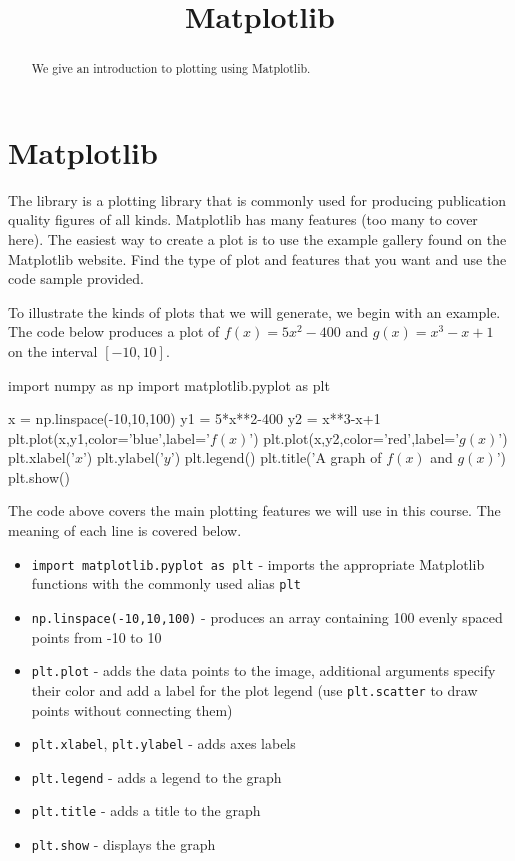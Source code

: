 \documentclass{ximera}
\title{Matplotlib}
\begin{document}
  
\begin{abstract}  
We give an introduction to plotting using Matplotlib.
\end{abstract}  
\maketitle

\section{Matplotlib}

The  library is a plotting library that is commonly used for producing publication quality figures of all kinds. Matplotlib has many features (too many to cover here). The easiest way to create a plot is to use the example gallery found on the Matplotlib website. Find the type of plot and features that you want and use the code sample provided.

To illustrate the kinds of plots that we will generate, we begin with an example. The code below produces a plot of $f(x)=5x^2-400$ and $g(x)=x^3-x+1$ on the interval $[-10,10]$. 

\begin{sageCell}
import numpy as np
import matplotlib.pyplot as plt

x = np.linspace(-10,10,100)
y1 = 5*x**2-400
y2 = x**3-x+1
plt.plot(x,y1,color='blue',label='$f(x)$')
plt.plot(x,y2,color='red',label='$g(x)$')
plt.xlabel('$x$')
plt.ylabel('$y$')
plt.legend()
plt.title('A graph of $f(x)$ and $g(x)$')
plt.show()
\end{sageCell}

The code above covers the main plotting features we will use in this course. The meaning of each line is covered below.

\begin{itemize}
	\item \verb|import matplotlib.pyplot as plt| - imports the appropriate Matplotlib functions with the commonly used alias \verb|plt|
	\item \verb|np.linspace(-10,10,100)| - produces an array containing 100 evenly spaced points from -10 to 10
	\item \verb|plt.plot| - adds the data points to the image, additional arguments specify their color and add a label for the plot legend (use \verb|plt.scatter| to draw points without connecting them)
	\item \verb|plt.xlabel|, \verb|plt.ylabel| - adds axes labels
	\item \verb|plt.legend| - adds a legend to the graph
	\item \verb|plt.title| - adds a title to the graph
	\item \verb|plt.show| - displays the graph
\end{itemize}
\end{document}
